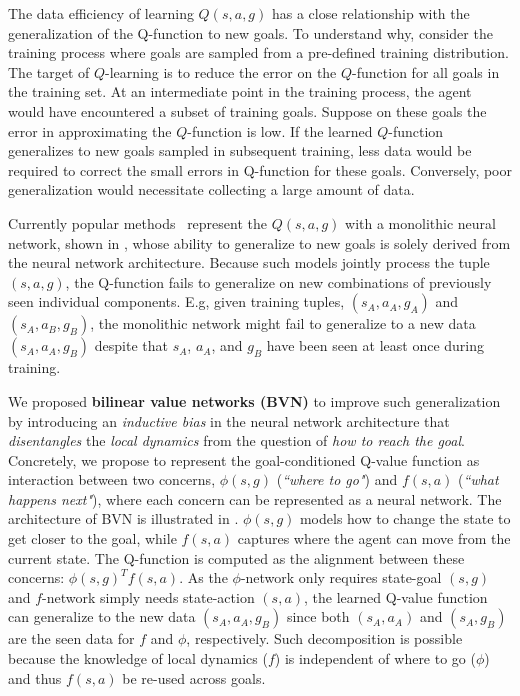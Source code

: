 \documentclass[dvipsnames]{article} %
\theoremstyle{definition}
\theoremstyle{remark}
\begin{document}
The data efficiency of learning $Q(s,a,g)$ has a close relationship with the generalization of the Q-function to new goals. %
To understand why, consider the training process where goals are sampled from a pre-defined training distribution. The target of $Q$-learning is to reduce the error on the $Q$-function for all goals in the training set. At an intermediate point in the training process, the agent would have encountered a subset of training goals. Suppose on these goals the error in approximating the $Q$-function is low. If the learned $Q$-function generalizes to new goals sampled in subsequent training, less data would be required to correct the small errors in Q-function for these goals. Conversely, poor generalization would necessitate collecting a large amount of data. 


Currently popular methods~\citep{Schaul2015UVFA,Andrychowicz2017her} represent the $Q(s, a, g)$ with a monolithic neural network, shown in , whose ability to generalize to new goals is solely derived from the neural network architecture. Because such models jointly process the tuple $(s, a, g)$, the Q-function fails to generalize on new combinations of previously seen individual components. E.g, given training tuples, $(s_A, a_A, g_A)$ and $(s_A, a_B, g_B)$, the monolithic network might fail to generalize to a new data $(s_A, a_A, g_B)$ despite that $s_A$, $a_A$, and $g_B$ have been seen at least once during training.

We proposed \textbf{bilinear value networks (BVN)} to improve such generalization by introducing an \textit{inductive bias} in the neural network architecture that \textit{disentangles} the \textit{local dynamics} from the question of \textit{how to reach the goal}.  
Concretely, we propose to represent the goal-conditioned Q-value function as interaction between two concerns, $\phi(s,g)$ (\textit{``where to go"}) and $f(s,a)$ (\textit{``what happens next"}), where each concern can be represented as a neural network. The architecture of BVN is illustrated in . $\phi(s,g)$ models how to change the state to get closer to the goal, while $f(s,a)$ captures where the agent can move from the current state. The Q-function is computed as the alignment between these concerns: $\phi(s,g)^Tf(s,a)$. 
As the $\phi$-network only requires state-goal $(s, g)$ and $f$-network simply needs state-action $(s, a)$, the learned Q-value function can generalize to the new data $(s_A, a_A, g_B)$ since both $(s_A, a_A)$ and $(s_A, g_B)$ are the seen data for $f$ and $\phi$, respectively.
Such decomposition is possible because the knowledge of local dynamics ($f$) is independent of where to go ($\phi$) and thus $f(s,a)$ be re-used across goals.
\end{document}
